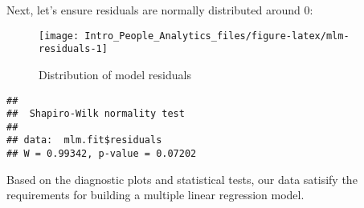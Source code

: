 \documentclass[
]{book}
\newenvironment{Shaded}{\begin{snugshade}}{\end{snugshade}}
\newcommand{\AttributeTok}[1]{\textcolor[rgb]{0.77,0.63,0.00}{#1}}
\newcommand{\CommentTok}[1]{\textcolor[rgb]{0.56,0.35,0.01}{\textit{#1}}}
\newcommand{\FloatTok}[1]{\textcolor[rgb]{0.00,0.00,0.81}{#1}}
\newcommand{\FunctionTok}[1]{\textcolor[rgb]{0.00,0.00,0.00}{#1}}
\newcommand{\NormalTok}[1]{#1}
\newcommand{\SpecialCharTok}[1]{\textcolor[rgb]{0.00,0.00,0.00}{#1}}
\newcommand{\StringTok}[1]{\textcolor[rgb]{0.31,0.60,0.02}{#1}}
\begin{document}
Next, let's ensure residuals are normally distributed around 0:

\begin{Shaded}
\end{Shaded}

\begin{figure}

{\centering \texttt{[image: Intro\_People\_Analytics\_files/figure-latex/mlm-residuals-1]} 

}

\caption{Distribution of model residuals}\label{fig:mlm-residuals}
\end{figure}

\begin{Shaded}
\end{Shaded}

\begin{verbatim}
## 
##  Shapiro-Wilk normality test
## 
## data:  mlm.fit$residuals
## W = 0.99342, p-value = 0.07202
\end{verbatim}

Based on the diagnostic plots and statistical tests, our data satisify the requirements for building a multiple linear regression model.
\end{document}
